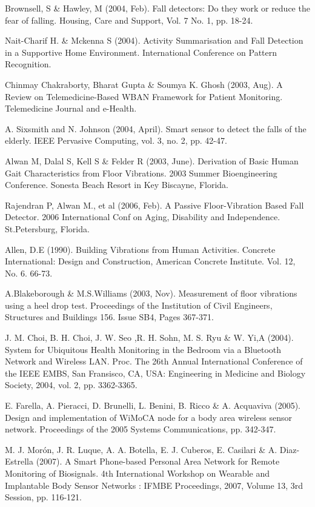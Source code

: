 \begin{thebibliography}{}
Brownsell, S \& Hawley, M (2004, Feb). Fall detectors: Do they work or reduce the fear of falling. Housing, Care and Support, Vol. 7 No. 1, pp. 18-24.

Nait-Charif H. \& Mckenna S (2004). Activity Summarisation and Fall Detection in a Supportive Home Environment. International Conference on Pattern Recognition.

Chinmay Chakraborty, Bharat Gupta \& Soumya K. Ghosh (2003, Aug). A Review on Telemedicine-Based WBAN Framework for Patient Monitoring. Telemedicine Journal and e-Health.

A. Sixsmith and N. Johnson (2004, April). Smart sensor to detect the falls of the elderly. IEEE Pervasive Computing, vol. 3, no. 2, pp. 42-47.

Alwan M, Dalal S, Kell S \& Felder R (2003, June). Derivation of Basic Human Gait Characteristics from Floor Vibrations. 2003 Summer Bioengineering Conference. Sonesta Beach Resort in Key Biscayne, Florida.

Rajendran P, Alwan M., et al (2006, Feb). A Passive Floor-Vibration Based Fall Detector. 2006 International Conf on Aging, Disability and Independence. St.Petersburg, Florida.

Allen, D.E (1990). Building Vibrations from Human Activities. Concrete International: Design and Construction, American Concrete Institute. Vol. 12, No. 6. 66-73. 

A.Blakeborough \& M.S.Williams (2003, Nov). Measurement of floor vibrations using a heel drop test. Proceedings of the Institution of Civil Engineers, Structures and Buildings 156. Issue SB4, Pages 367-371.

J. M. Choi, B. H. Choi, J. W. Seo ,R. H. Sohn, M. S. Ryu \& W. Yi,A (2004). System  for Ubiquitous Health  Monitoring  in  the Bedroom  via a  Bluetooth Network  and   Wireless  LAN.  Proc. The 26th  Annual  International  Conference  of  the  IEEE  EMBS,  San  Fransisco,  CA,  USA: Engineering in Medicine and Biology Society, 2004, vol. 2, pp. 3362-3365.

E. Farella, A. Pieracci, D. Brunelli, L. Benini, B. Ricco \& A. Acquaviva (2005). Design  and implementation of WiMoCA node for a body area wireless sensor network. Proceedings  of the 2005 Systems Communications, pp. 342-347. 

M. J. Morón, J. R. Luque, A. A. Botella, E. J. Cuberos, E. Casilari \& A. Diaz-Estrella (2007). A Smart  Phone-based  Personal  Area  Network  for  Remote  Monitoring  of  Biosignals. 4th International Workshop on Wearable and Implantable Body Sensor Networks : IFMBE Proceedings, 2007, Volume 13, 3rd Session, pp. 116-121.


\end{thebibliography}
